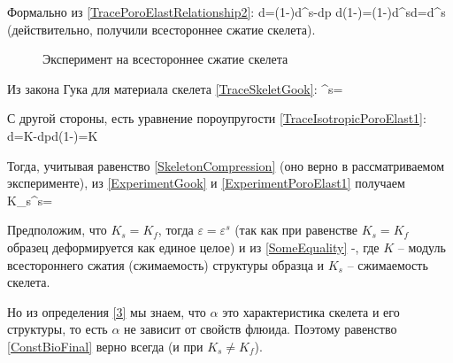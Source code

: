 \documentclass[main.tex]{subfiles}
\begin{document}
Формально из \eqref{TracePoroElastRelationship2}:
\beq\label{SkeletonCompression}
d\sigma=\left(1-\varphi\right)d\sigma^s-\varphi dp d\sigma\left(1-\varphi\right)=\left(1-\varphi\right)d\sigma^s\Rightarrow d\sigma=d\sigma^s
\eeq
(действительно, получили всестороннее сжатие скелета).

\begin{figure}[h]
\centering
{}
\caption{Эксперимент на всестороннее сжатие скелета}
\end{figure}

Из закона Гука для материала скелета \eqref{TraceSkeletGook}:
\beq\label{ExperimentGook}
\varepsilon^s=
\eeq

С другой стороны, есть уравнение пороупругости \eqref{TraceIsotropicPoroElast1}:
\beq\label{ExperimentPoroElast1}
d\sigma=K\varepsilon-\alpha dpd\sigma\left(1-\alpha\right)=K\varepsilon
\eeq

Тогда, учитывая равенство \eqref{SkeletonCompression} (оно верно в рассматриваемом эксперименте), из \eqref{ExperimentGook} и \eqref{ExperimentPoroElast1} получаем
\beq\label{SomeEquality}
K_s\varepsilon^s=
\eeq

Предположим, что $K_s=K_f$, тогда $\varepsilon=\varepsilon^s$ (так как при равенстве $K_s=K_f$ образец деформируется как единое целое) и из \eqref{SomeEquality}
\beq\label{ConstBioFinal}
-,
\eeq
где $K$ -- модуль всестороннего сжатия (сжимаемость) структуры образца и $K_s$ -- сжимаемость скелета.

Но из определения \eqref{3} мы знаем, что $\alpha$ это характеристика скелета и его структуры, то есть $\alpha$ не зависит от свойств флюида. Поэтому равенство \eqref{ConstBioFinal} верно всегда (и при $K_s\neq K_f$).
\end{document}
